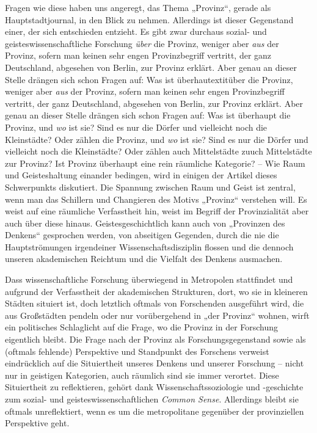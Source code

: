 \begin{multicols*}{2}
Fragen wie diese haben uns angeregt, das Thema „Provinz“, gerade als Hauptstadtjournal, in den Blick zu nehmen. Allerdings ist dieser Gegenstand einer, der sich entschieden entzieht. Es gibt zwar durchaus sozial- und geisteswissenschaftliche Forschung \textit{über} die Provinz, weniger aber \textit{aus} der Provinz, sofern man keinen sehr engen Provinzbegriff vertritt, der ganz Deutschland, abgesehen von Berlin, zur Provinz erklärt. Aber genau an dieser Stelle drängen sich schon Fragen auf: Was ist überhautextit{über} die Provinz, weniger aber \textit{aus} der Provinz, sofern man keinen sehr engen Provinzbegriff vertritt, der ganz Deutschland, abgesehen von Berlin, zur Provinz erklärt. Aber genau an dieser Stelle drängen sich schon Fragen auf: Was ist überhaupt die Provinz, und \textit{wo} ist sie? Sind es nur die Dörfer und vielleicht noch die Kleinstädte? Oder zählen die Provinz, und \textit{wo} ist sie? Sind es nur die Dörfer und vielleicht noch die Kleinstädte? Oder zählen auch Mittelstädte zuuch Mittelstädte zur Provinz? Ist Provinz überhaupt eine rein räumliche Kategorie? – Wie Raum und Geisteshaltung einander bedingen, wird in einigen der Artikel dieses Schwerpunkts diskutiert. Die Spannung zwischen Raum und Geist ist zentral, wenn man das Schillern und Changieren des Motivs „Provinz“ verstehen will. Es weist auf eine räumliche Verfasstheit hin, weist im Begriff der Provinzialität aber auch über diese hinaus. Geistesgeschichtlich kann auch von „Provinzen des Denkens“ gesprochen werden, von abseitigen Gegenden, durch die nie die Hauptströmungen irgendeiner Wissenschaftsdisziplin flossen und die dennoch unseren akademischen Reichtum und die Vielfalt des Denkens ausmachen.

Dass wissenschaftliche Forschung überwiegend in Metropolen stattfindet und aufgrund der Verfasstheit der akademischen Strukturen, dort, wo sie in kleineren Städten situiert ist, doch letztlich oftmals von Forschenden ausgeführt wird, die aus Großstädten pendeln oder nur vorübergehend in „der Provinz“ wohnen, wirft ein politisches Schlaglicht auf die Frage, wo die Provinz in der Forschung eigentlich bleibt. Die Frage nach der Provinz als Forschungsgegenstand sowie als (oftmals fehlende) Perspektive und Standpunkt des Forschens verweist eindrücklich auf die Situiertheit unseres Denkens und unserer Forschung – nicht nur in geistigen Kategorien, auch räumlich sind sie immer verortet. Diese Situiertheit zu reflektieren, gehört dank Wissenschaftssoziologie und -geschichte zum sozial- und geisteswissenschaftlichen \textit{Common Sense}. Allerdings bleibt sie oftmals unreflektiert, wenn es um die metropolitane gegenüber der provinziellen Perspektive geht.


\end{multicols*}
